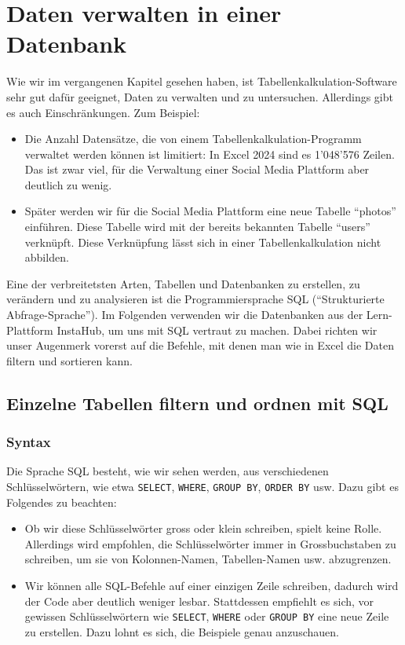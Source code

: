 \section{Daten verwalten in einer Datenbank} 
Wie wir im vergangenen Kapitel gesehen haben, ist Tabellenkalkulation-Software sehr gut dafür geeignet, Daten zu verwalten und zu untersuchen. Allerdings gibt es auch Einschränkungen. Zum Beispiel:
\begin{itemize}
  \item Die Anzahl Datensätze, die von einem Tabellenkalkulation-Programm verwaltet werden können ist limitiert: In Excel 2024 sind es 1'048'576 Zeilen. Das ist zwar viel, für die Verwaltung einer Social Media Plattform aber deutlich zu wenig.
  \item Später werden wir für die Social Media Plattform eine neue Tabelle \enquote{photos} einführen. Diese Tabelle wird mit der bereits bekannten Tabelle \enquote{users} verknüpft. Diese Verknüpfung lässt sich in einer Tabellenkalkulation nicht abbilden.
\end{itemize}

Eine der verbreitetsten Arten, Tabellen und Datenbanken zu erstellen, zu verändern und zu analysieren ist die Programmiersprache \gls{SQL} (\enquote{Strukturierte Abfrage-Sprache}). 
Im Folgenden verwenden wir die Datenbanken aus der Lern-Plattform InstaHub, um uns mit \gls{SQL}  vertraut zu machen. Dabei richten wir unser Augenmerk vorerst auf die Befehle, mit denen man wie in Excel die Daten filtern und sortieren kann.

\subsection{Einzelne Tabellen filtern und ordnen mit \texorpdfstring{\gls{SQL}}{SQL}}

\lstset{style=sql}

\subsubsection*{Syntax}
Die Sprache \acrfull{SQL} besteht, wie wir sehen werden, aus verschiedenen Schlüsselwörtern, wie etwa \lstinline|SELECT|, \lstinline|WHERE|, \lstinline|GROUP BY|, \lstinline|ORDER BY| usw. Dazu gibt es Folgendes zu beachten:
\begin{itemize}
  \item Ob wir diese Schlüsselwörter gross oder klein schreiben, spielt keine Rolle. Allerdings wird empfohlen, die Schlüsselwörter immer in Grossbuchstaben zu schreiben, um sie von Kolonnen-Namen, Tabellen-Namen usw. abzugrenzen.
  \item Wir können alle \gls{SQL}-Befehle auf einer einzigen Zeile schreiben, dadurch wird der Code aber deutlich weniger lesbar. Stattdessen empfiehlt es sich, vor gewissen Schlüsselwörtern wie \lstinline|SELECT|, \lstinline|WHERE| oder \lstinline|GROUP BY| eine neue Zeile zu erstellen. Dazu lohnt es sich, die Beispiele genau anzuschauen.
\end{itemize}

